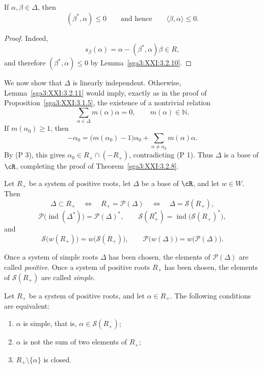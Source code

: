 \begin{lemma}\label{sga3:XXI:3.2.11}
If \(\alpha,\beta\in\Delta\), then
\[
 (\beta^\ast,\alpha)\leq0
 \qquad\text{and hence}\qquad
 \langle\beta,\alpha\rangle\leq0.
\]
\end{lemma}

\begin{proof}
Indeed,
\[
 s_\beta(\alpha)
 =\alpha-(\beta^\ast,\alpha)\beta\in R,
\]
and therefore \((\beta^\ast,\alpha)\leq0\) by
Lemma~\ref{sga3:XXI:3.2.10}.
\end{proof}

We now show that \(\Delta\) is linearly independent. Otherwise,
Lemma~\ref{sga3:XXI:3.2.11} would imply, exactly as in the proof of
Proposition~\ref{sga3:XXI:3.1.5}, the existence of a nontrivial
relation
\[
 \sum_{\alpha\in\Delta}m(\alpha)\alpha=0,
 \qquad m(\alpha)\in\mathbb N.
\]
If \(m(\alpha_0)\geq1\), then
\[
 -\alpha_0
 =\bigl(m(\alpha_0)-1\bigr)\alpha_0
  +\sum_{\alpha\neq\alpha_0}m(\alpha)\alpha.
\]
By (P 3), this gives
\(\alpha_0\in R_+\cap(-R_+)\), contradicting (P 1).
Thus \(\Delta\) is a base of \(\cR\), completing the proof of
Theorem~\ref{sga3:XXI:3.2.8}.

\begin{corollary}\label{sga3:XXI:3.2.12}
Let \(R_+\) be a system of positive roots, let \(\Delta\) be a base of
\(\cR\), and let \(w\in W\). Then
\[
 \Delta\subset R_+
 \quad\Longleftrightarrow\quad
 R_+=\mathscr{P}(\Delta)
 \quad\Longleftrightarrow\quad
 \Delta=\mathscr{S}(R_+),
\]
\[
 \mathscr{P}\bigl(\operatorname{ind}(\Delta^\ast)\bigr)
   =\mathscr{P}(\Delta)^\ast,
 \qquad
 \mathscr{S}(R^\ast_+)
   =\operatorname{ind}\bigl(\mathscr{S}(R_+)^\ast\bigr),
\]
and
\[
 \mathscr{S}\bigl(w(R_+)\bigr)=w\bigl(\mathscr{S}(R_+)\bigr),
 \qquad
 \mathscr{P}\bigl(w(\Delta)\bigr)=w\bigl(\mathscr{P}(\Delta)\bigr).
\]
\end{corollary}

\begin{definition}\label{sga3:XXI:3.2.13}
Once a system of simple roots \(\Delta\) has been chosen, the elements
of \(\mathscr{P}(\Delta)\) are called \emph{positive}. Once a system
of positive roots \(R_+\) has been chosen, the elements of
\(\mathscr{S}(R_+)\) are called \emph{simple}.
\end{definition}

\begin{corollary}\label{sga3:XXI:3.2.14}
Let \(R_+\) be a system of positive roots, and let \(\alpha\in R_+\).
The following conditions are equivalent:
\begin{enumerate}
\item[\SGAInlineRefTarget{sga3:XXI:3.2.14:item:i}(i)] \(\alpha\) is simple, that is,
  \(\alpha\in\mathscr{S}(R_+)\);
\item[\SGAInlineRefTarget{sga3:XXI:3.2.14:item:ii}(ii)] \(\alpha\) is not the sum of two elements of \(R_+\);
\item[(iii)] \(R_+\setminus\{\alpha\}\) is closed.
\end{enumerate}
\end{corollary}

